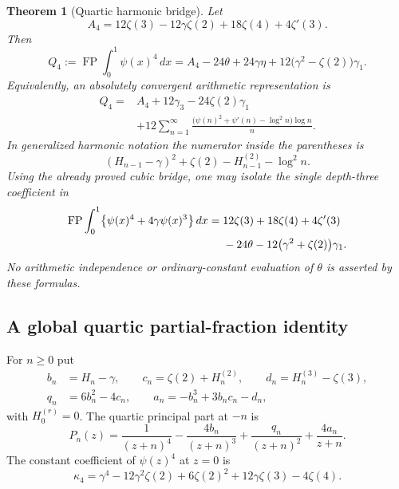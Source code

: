 \documentclass[11pt,a4paper]{article}
\numberwithin{equation}{section}
\newtheorem{theorem}{Theorem}[section]
\theoremstyle{definition}
\theoremstyle{remark}
\begin{document}
\begin{theorem}[Quartic harmonic bridge]\label{q4:main}
Let
\[
 A_4=12\zeta(3)-12\gamma\zeta(2)+18\zeta(4)+4\zeta'(3).
\]
Then
\begin{equation}\label{q4:bridge}
 \boxed{\displaystyle
 Q_4:=\operatorname{FP}\int_0^1\psi(x)^4\,dx
 =A_4-24\theta+24\gamma\eta
        +12\bigl(\gamma^2-\zeta(2)\bigr)\gamma_1.}
\end{equation}
Equivalently, an absolutely convergent arithmetic representation is
\begin{equation}\label{q4:arithmetic}
 \boxed{\begin{aligned}
 Q_4={}&A_4+12\gamma_3-24\zeta(2)\gamma_1\\
 &+12\sum_{n=1}^{\infty}
 \frac{\bigl(\psi(n)^2+\psi'(n)-\log^2n\bigr)\log n}{n}.
 \end{aligned}}
\end{equation}
In generalized harmonic notation the numerator inside the parentheses is
\[
 (H_{n-1}-\gamma)^2+\zeta(2)-H_{n-1}^{(2)}-\log^2n.
\]
Using the already proved cubic bridge, one may isolate the single
depth-three coefficient in
\begin{align}\label{q4:single-coordinate}
 \operatorname{FP}\int_0^1\bigl\{\psi(x)^4+4\gamma\psi(x)^3\bigr\}\,dx
 ={}&12\zeta(3)+18\zeta(4)+4\zeta'(3)\notag\\
 &-24\theta-12\bigl(\gamma^2+\zeta(2)\bigr)\gamma_1.
\end{align}
No arithmetic independence or ordinary-constant evaluation of $\theta$ is
asserted by these formulas.
\end{theorem}

\subsection{A global quartic partial-fraction identity}

For $n\geq0$ put
\begin{equation}\label{q4:coefficients}
 \begin{split}
 b_n&=H_n-\gamma,\qquad
 c_n=\zeta(2)+H_n^{(2)},\qquad
 d_n=H_n^{(3)}-\zeta(3),\\
 q_n&=6b_n^2-4c_n,\qquad
 a_n=-b_n^3+3b_nc_n-d_n,
 \end{split}
\end{equation}
with $H_0^{(r)}=0$.  The quartic principal part at $-n$ is
\begin{equation}\label{q4:Pn}
 P_n(z)=\frac1{(z+n)^4}-\frac{4b_n}{(z+n)^3}
             +\frac{q_n}{(z+n)^2}+\frac{4a_n}{z+n}.
\end{equation}
The constant coefficient of $\psi(z)^4$ at $z=0$ is
\begin{equation}\label{q4:kappa}
 \kappa_4=\gamma^4-12\gamma^2\zeta(2)+6\zeta(2)^2
                        +12\gamma\zeta(3)-4\zeta(4).
\end{equation}
\end{document}
